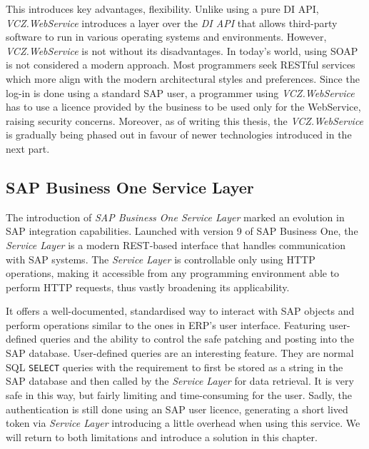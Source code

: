 This introduces key advantages, flexibility. 
Unlike using a pure DI API, \textit{VCZ.WebService} introduces a layer over the \textit{DI API} that allows third-party software to run in various operating systems and environments.
However, \textit{VCZ.WebService} is not without its disadvantages.
In today's world, using SOAP is not considered a modern approach. Most programmers seek RESTful services which more align with the modern architectural styles and preferences.
Since the log-in is done using a standard SAP user, a programmer using \textit{VCZ.WebService} has to use a licence provided by the business to be used only for the WebService, raising security concerns.
Moreover, as of writing this thesis, the \textit{VCZ.WebService} is gradually being phased out in favour of newer technologies introduced in the next part.

\subsection{SAP Business One Service Layer}
\label{subsec:sap-b1-service-layer}

The introduction of \textit{ SAP Business One Service Layer} marked an evolution in SAP integration capabilities. 
Launched with version 9 of SAP Business One, the \textit{Service Layer} is a modern REST-based interface that handles communication with SAP systems. 
The \textit{Service Layer} is controllable only using HTTP operations, making it accessible from any programming environment able to perform HTTP requests, thus vastly broadening its applicability.

It offers a well-documented, standardised way to interact with SAP objects and perform operations similar to the ones in ERP's user interface. 
Featuring user-defined queries and the ability to control the safe patching and posting into the SAP database.
User-defined queries are an interesting feature. They are normal SQL \texttt{SELECT} queries with the requirement to first be stored as a string in the SAP database and then called by the \textit{ Service Layer} for data retrieval.
It is very safe in this way, but fairly limiting and time-consuming for the user. 
Sadly, the authentication is still done using an SAP user licence, generating a short lived token via \textit{Service Layer} introducing a little overhead when using this service.
We will return to both limitations and introduce a solution in this chapter.

